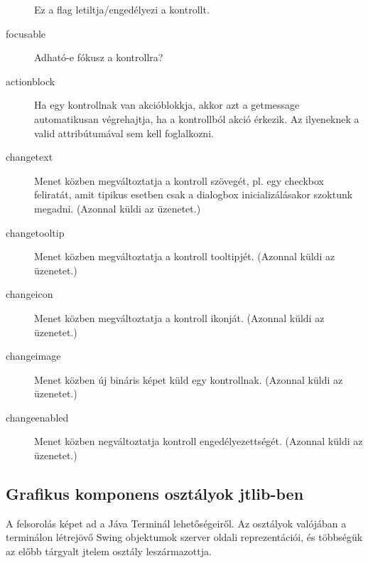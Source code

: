 \begin{description}
    Ez a flag letiltja/engedélyezi a kontrollt.
\item[focusable]  
    Adható-e fókusz a kontrollra?
\item[actionblock]
    Ha egy kontrollnak van akcióblokkja,
    akkor azt a getmessage automatikusan végrehajtja,
    ha a kontrollból akció érkezik. Az ilyeneknek a
    valid attribútumával sem kell foglalkozni.
\item[changetext]
    Menet közben megváltoztatja a kontroll szövegét, 
    pl. egy checkbox feliratát, amit tipikus esetben csak
    a dialogbox inicializálásakor szoktunk megadni.
    (Azonnal küldi az üzenetet.)
\item[changetooltip]
    Menet közben megváltoztatja a kontroll tooltipjét. (Azonnal küldi az üzenetet.) 
\item[changeicon]
    Menet közben megváltoztatja a kontroll ikonját. (Azonnal küldi az üzenetet.) 
\item[changeimage]
    Menet közben új bináris képet küld egy kontrollnak. (Azonnal küldi az üzenetet.) 
\item[changeenabled]
    Menet közben negváltoztatja kontroll engedélyezettségét. (Azonnal küldi az üzenetet.) 
\end{description}



\subsection{Grafikus komponens osztályok jtlib-ben} 

A felsorolás képet ad a Jáva Terminál lehetőségeiről.
Az osztályok valójában a terminálon létrejövő Swing objektumok
szerver oldali reprezentációi, és többségük az előbb tárgyalt jtelem 
osztály leszármazottja.

